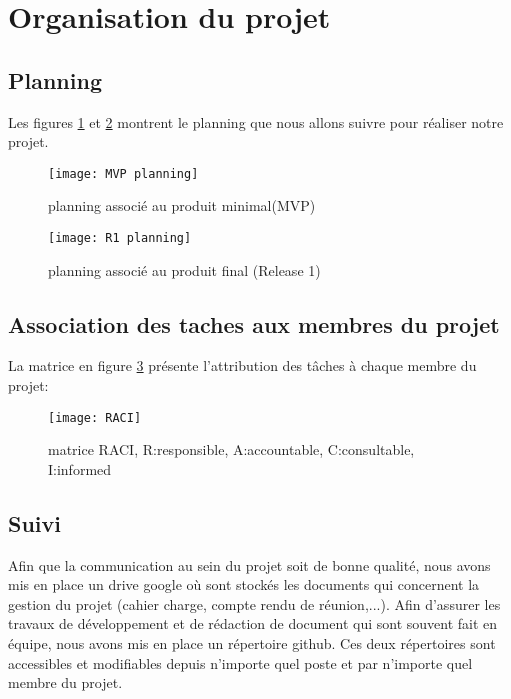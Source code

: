 \chapter*{Organisation du projet}
\label{sec:organisation}
\section*{Planning}
Les figures \ref{fig:mvp-plan} et \ref{fig:r1-plan} montrent le planning que nous allons suivre pour réaliser notre projet.

\begin{figure}[!ht]
	\centering
	\texttt{[image: MVP planning]}
	\caption{planning associé au produit minimal(MVP)}
	\label{fig:mvp-plan}
\end{figure}

\begin{figure}[!ht]
	\centering
	\texttt{[image: R1 planning]}
	\caption{planning associé au produit final (Release 1)}
	\label{fig:r1-plan}
\end{figure}


\section*{Association des taches aux membres du projet}
La matrice en figure \ref{fig:raci} présente l'attribution des tâches à chaque membre du projet:


\begin{figure}[!h]
	\centering
	\texttt{[image: RACI]}
	\caption{matrice RACI, R:responsible, A:accountable, C:consultable, I:informed}
	\label{fig:raci}
\end{figure}
\section*{Suivi}
Afin que la communication au sein du projet soit de bonne qualité, nous avons mis en place un drive google où sont stockés les documents qui concernent la gestion du projet (cahier charge, compte rendu de réunion,...). Afin d'assurer les travaux de développement et de rédaction de document qui sont souvent fait en équipe, nous avons mis en place un répertoire github. Ces deux répertoires sont accessibles et modifiables depuis n'importe quel poste et par n'importe quel membre du projet. 

